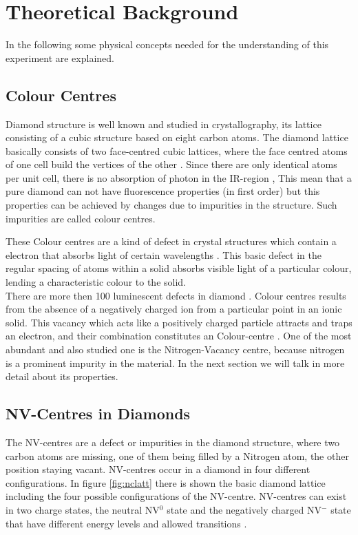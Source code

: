\section{Theoretical Background}
In the following some physical concepts needed for the understanding of this experiment are explained.
\subsection{Colour Centres}

Diamond structure is well known and studied in crystallography, its lattice consisting of a cubic structure based on eight carbon atoms. The diamond lattice basically consists of two face-centred cubic lattices, where the face centred atoms of one cell build the vertices of the other \cite{sir_c_v_raman_crystal_1944}. Since there are only  identical atoms per unit cell, there is no absorption of photon in the IR-region \cite{mildren_1_nodate}, This mean that a pure diamond can not have fluorescence properties (in first order) but this properties can be achieved by changes due to impurities in the structure. Such impurities are called colour centres.

These Colour centres are a kind of defect in crystal structures which contain a electron that absorbs light of certain wavelengths \cite{lesik_engineering_2015}. This basic defect in the regular spacing of atoms within a solid absorbs visible light of a particular colour, lending a characteristic colour to the solid. \\

There are more then 100 luminescent defects in diamond \cite{jelezko_single_2006}. Colour centres results from the absence of a negatively charged ion from a particular point in an ionic solid. This vacancy which acts like a positively charged particle attracts and traps an electron, and their combination constitutes an Colour-centre \cite{choudhury_principles_2014}. One of the most abundant and also studied one is the Nitrogen-Vacancy centre, because  nitrogen is a prominent impurity in the material. In the next section we will talk in more detail about its properties.


\subsection{NV-Centres in Diamonds}
\label{sec:nvcentres}
 The NV-centres are a defect or impurities in the diamond structure, where two carbon atoms are missing, one of them being filled by a Nitrogen atom, the other position staying vacant. NV-centres occur in a diamond in four different configurations. In figure \ref{fig:nclatt} there is shown the basic diamond lattice including the four possible configurations of the NV-centre. NV-centres can exist in two charge states, the neutral NV$^{0}$ state and the negatively charged NV$^{-}$ state that have different energy levels and allowed transitions \cite{pham_magnetic_nodate}.\\
 
